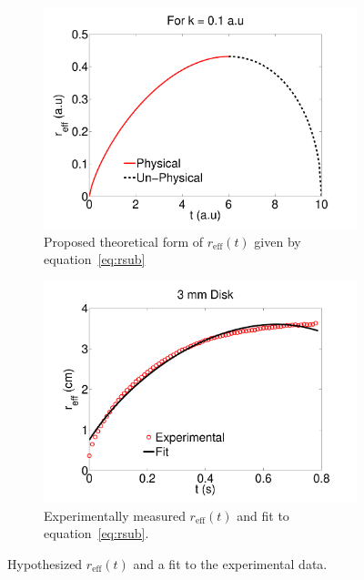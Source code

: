 \documentclass[12pt]{article}
\begin{document}
\begin{figure}[h]
	\begin{subfigure}[h]{0.45\textwidth}
   	\centering
       \includegraphics[scale=0.3]{kp1au.pdf}
       \caption{Proposed theoretical form of $r_{\mathrm{eff}}(t)$ given by equation~\ref{eq:rsub}}
       \label{fig:kp1au}
	\end{subfigure}
	\hfill
	\begin{subfigure}[h]{0.45\textwidth}
    \centering
       \includegraphics[scale=0.3]{theorytest_3mm.pdf}
       \caption{Experimentally measured $r_{\mathrm{eff}}(t)$ and fit to equation~\ref{eq:rsub}.}
       \label{fig:tt3mm}
	\end{subfigure}
	\caption{Hypothesized $r_{\mathrm{eff}}(t)$ and a fit to the experimental data.}
\end{figure}
\end{document}
